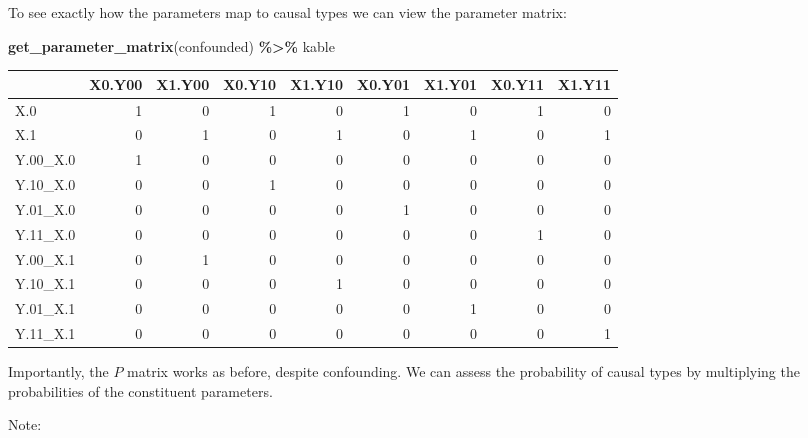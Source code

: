\documentclass[
  12pt,
]{book}
\newenvironment{Shaded}{\begin{snugshade}}{\end{snugshade}}
\newcommand{\FunctionTok}[1]{\textcolor[rgb]{0.13,0.29,0.53}{\textbf{#1}}}
\newcommand{\NormalTok}[1]{#1}
\newcommand{\SpecialCharTok}[1]{\textcolor[rgb]{0.81,0.36,0.00}{\textbf{#1}}}
\begin{document}
To see exactly how the parameters map to causal types we can view the parameter matrix:

\begin{Shaded}
\begin{Highlighting}[]
\FunctionTok{get\_parameter\_matrix}\NormalTok{(confounded) }\SpecialCharTok{\%\textgreater{}\%}\NormalTok{ kable}
\end{Highlighting}
\end{Shaded}

\begin{tabular}{l|r|r|r|r|r|r|r|r}
\hline
  & X0.Y00 & X1.Y00 & X0.Y10 & X1.Y10 & X0.Y01 & X1.Y01 & X0.Y11 & X1.Y11\\
\hline
X.0 & 1 & 0 & 1 & 0 & 1 & 0 & 1 & 0\\
\hline
X.1 & 0 & 1 & 0 & 1 & 0 & 1 & 0 & 1\\
\hline
Y.00\_X.0 & 1 & 0 & 0 & 0 & 0 & 0 & 0 & 0\\
\hline
Y.10\_X.0 & 0 & 0 & 1 & 0 & 0 & 0 & 0 & 0\\
\hline
Y.01\_X.0 & 0 & 0 & 0 & 0 & 1 & 0 & 0 & 0\\
\hline
Y.11\_X.0 & 0 & 0 & 0 & 0 & 0 & 0 & 1 & 0\\
\hline
Y.00\_X.1 & 0 & 1 & 0 & 0 & 0 & 0 & 0 & 0\\
\hline
Y.10\_X.1 & 0 & 0 & 0 & 1 & 0 & 0 & 0 & 0\\
\hline
Y.01\_X.1 & 0 & 0 & 0 & 0 & 0 & 1 & 0 & 0\\
\hline
Y.11\_X.1 & 0 & 0 & 0 & 0 & 0 & 0 & 0 & 1\\
\hline
\end{tabular}

Importantly, the \(P\) matrix works as before, despite confounding. We can assess the probability of causal types by multiplying the probabilities of the constituent parameters.

Note:
\end{document}
